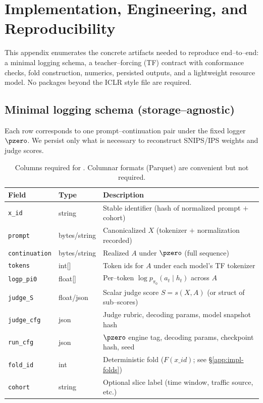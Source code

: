 \section{Implementation, Engineering, and Reproducibility}
\label{app:impl}

This appendix enumerates the concrete artifacts needed to reproduce \CJE{} end–to–end: a minimal logging schema, a teacher–forcing (TF) contract with conformance checks, fold construction, numerics, persisted outputs, and a lightweight resource model. No packages beyond the ICLR style file are required.

\subsection{Minimal logging schema (storage–agnostic)}
\label{app:impl-schema}
Each row corresponds to one prompt–continuation pair under the fixed logger $\pzero$. We persist only what is necessary to reconstruct SNIPS/IPS weights and judge scores.

\begin{table}[h]
\centering
\caption{Columns required for \CJE{}. Columnar formats (Parquet) are convenient but not required.}
\label{tab:schema}
\begin{tabular}{lll}
\toprule
\textbf{Field} & \textbf{Type} & \textbf{Description} \\
\midrule
\texttt{x\_id} & string & Stable identifier (hash of normalized prompt $+$ cohort) \\
\texttt{prompt} & bytes/string & Canonicalized $X$ (tokenizer $+$ normalization recorded) \\
\texttt{continuation} & bytes/string & Realized $A$ under $\pzero$ (full sequence) \\
\texttt{tokens} & int[] & Token ids for $A$ under each model’s TF tokenizer \\
\texttt{logp\_pi0} & float[] & Per–token $\log p_{\pi_0}(a_t\!\mid\!h_t)$ across $A$ \\
\texttt{judge\_S} & float/json & Scalar judge score $S=s(X,A)$ (or struct of sub–scores) \\
\texttt{judge\_cfg} & json & Judge rubric, decoding params, model snapshot hash \\
\texttt{run\_cfg} & json & $\pzero$ engine tag, decoding params, checkpoint hash, seed \\
\texttt{fold\_id} & int & Deterministic fold ($F(x\_id)$; see \S\ref{app:impl-folds}) \\
\texttt{cohort} & string & Optional slice label (time window, traffic source, etc.) \\
\bottomrule
\end{tabular}
\end{table}

